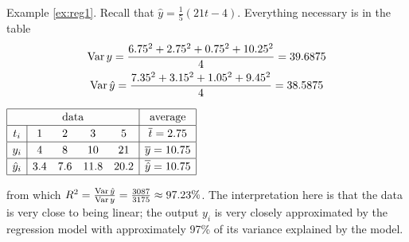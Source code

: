 \begin{tcolorbox}[exstyle]{}\vspace{-5pt}
\begin{description}
\begin{minipage}[t]{0.57\linewidth}\vspace{0pt}
  \item[Example \ref{ex:reg1}.]\lstsp Recall that $\hat y=\frac 15(21t-4)$. Everything necessary is in the table
  \begin{gather*}
  \operatorname{Var} y=\frac{6.75^2+2.75^2+0.75^2+10.25^2}4 =39.6875\\
  \operatorname{Var}\hat y=\frac{7.35^2+3.15^2+1.05^2+9.45^2}4=38.5875
  \end{gather*}
\end{minipage}\hfill\begin{minipage}[t]{0.42\linewidth}\vspace{0pt}
	\flushright
	$\renewcommand{\arraystretch}{1.2}
	\begin{array}{|c|cccc|c|}
	\hline
	\multicolumn{5}{|c|}{\text{data}}&\text{average}\\\hline
	t_i&1&2&3&5&\cl t=2.75\\\hline
	y_i&4&8&10&21&\cl y=10.75\\\hline
	\hat y_i&3.4&7.6&11.8&20.2&\cl{\hat y}=10.75\\\hline
\end{array}$
\end{minipage}\par

  from which $R^2=\frac{\operatorname{Var}\hat y}{\operatorname{Var} y}=\frac{3087}{3175}\approx 97.23\%$. The interpretation here is that the data is very close to being linear; the output $y_i$ is very closely approximated by the regression model with approximately 97\% of its variance explained by the model.\par
  

\end{description}
\end{tcolorbox}
